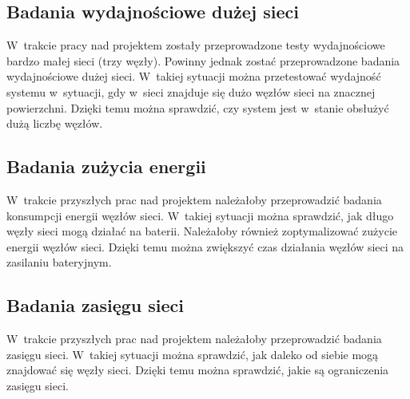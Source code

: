 \subsection{Badania wydajnościowe dużej sieci}
W~trakcie pracy nad projektem zostały przeprowadzone testy wydajnościowe bardzo małej sieci (trzy węzły).
Powinny jednak zostać przeprowadzone badania wydajnościowe dużej sieci.
W~takiej sytuacji można przetestować wydajność systemu w~sytuacji, gdy w~sieci znajduje się dużo węzłów sieci na znacznej powierzchni.
Dzięki temu można sprawdzić, czy system jest w~stanie obsłużyć dużą liczbę węzłów.

\subsection{Badania zużycia energii}
W~trakcie przyszłych prac nad projektem należałoby przeprowadzić badania konsumpcji energii węzłów sieci.
W~takiej sytuacji można sprawdzić, jak długo węzły sieci mogą działać na baterii.
Należałoby również zoptymalizować zużycie energii węzłów sieci.
Dzięki temu można zwiększyć czas działania węzłów sieci na zasilaniu bateryjnym.

\subsection{Badania zasięgu sieci}
W~trakcie przyszłych prac nad projektem należałoby przeprowadzić badania zasięgu sieci.
W~takiej sytuacji można sprawdzić, jak daleko od siebie mogą znajdować się węzły sieci.
Dzięki temu można sprawdzić, jakie są ograniczenia zasięgu sieci.
